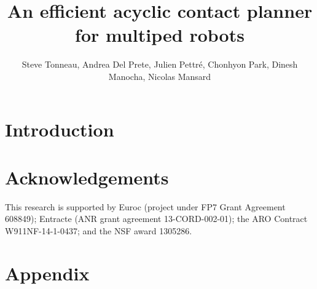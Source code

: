 \documentclass[shortAfour,sageh]{sagej}
\begin{document}

\title{An efficient acyclic contact planner for multiped robots}

\author{Steve Tonneau, Andrea Del Prete, Julien Pettr\'e, Chonhyon Park, Dinesh Manocha, Nicolas Mansard}



\begin{abstract}
	
\end{abstract}


\maketitle

\section{Introduction}






\section*{Acknowledgements}
This research is supported by Euroc (project under FP7 Grant Agreement  608849);  Entracte (ANR  grant  agreement  13-CORD-002-01);
the ARO Contract W911NF-14-1-0437; and the NSF award 1305286. %





\appendix
\section*{Appendix}






\end{document}
